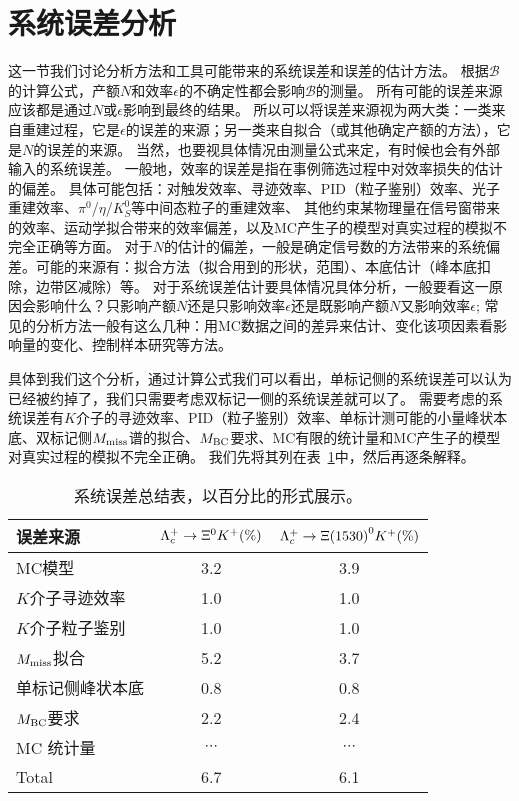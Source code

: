\section{系统误差分析}
这一节我们讨论分析方法和工具可能带来的系统误差和误差的估计方法。
根据$\mathcal{B}$的计算公式，产额$N$和效率$\epsilon$的不确定性都会影响$\mathcal{B}$的测量。
所有可能的误差来源应该都是通过$N$或$\epsilon$影响到最终的结果。
所以可以将误差来源视为两大类：一类来自重建过程，它是$\epsilon$的误差的来源；另一类来自拟合（或其他确定产额的方法），它是$N$的误差的来源。
当然，也要视具体情况由测量公式来定，有时候也会有外部输入的系统误差。
一般地，效率的误差是指在事例筛选过程中对效率损失的估计的偏差。
具体可能包括：对触发效率、寻迹效率、PID（粒子鉴别）效率、光子重建效率、$\pi^{0}$/$\eta$/$K_{S}^{0}$等中间态粒子的重建效率、
其他约束某物理量在信号窗带来的效率、运动学拟合带来的效率偏差，以及MC产生子的模型对真实过程的模拟不完全正确等方面。
对于$N$的估计的偏差，一般是确定信号数的方法带来的系统偏差。可能的来源有：拟合方法（拟合用到的形状，范围）、本底估计（峰本底扣除，边带区减除）等。
对于系统误差估计要具体情况具体分析，一般要看这一原因会影响什么？只影响产额$N$还是只影响效率$\epsilon$还是既影响产额$N$又影响效率$\epsilon$;
常见的分析方法一般有这么几种：用MC数据之间的差异来估计、变化该项因素看影响量的变化、控制样本研究等方法。


具体到我们这个分析，通过计算公式我们可以看出，单标记侧的系统误差可以认为已经被约掉了，我们只需要考虑双标记一侧的系统误差就可以了。
需要考虑的系统误差有$K$介子的寻迹效率、PID（粒子鉴别）效率、单标计测可能的小量峰状本底、双标记侧$M_{\rm miss}$谱的拟合、$M_{\rm BC}$要求、MC有限的统计量和MC产生子的模型对真实过程的模拟不完全正确。
我们先将其列在表~\ref{tab:sys_err}中，然后再逐条解释。

\begin{table}[hp]
  \begin{center}
    \caption{系统误差总结表，以百分比的形式展示。}
  \begin{tabular}{l|c|c}
      \hline \hline
			误差来源            &  $\Lambda_{c}^{+}\rightarrow \Xi^{0}K^{+}(\%)$ &  $\Lambda_{c}^{+}\rightarrow \Xi{(1530)}^{0}K^{+}(\%)$ \\
			\hline  
			 MC模型          &    3.2     &     3.9     \\
			$K$介子寻迹效率  &    1.0      &    1.0      \\
			$K$介子粒子鉴别   &    1.0      &    1.0      \\
			$M_{\rm miss}$拟合&    5.2     &     3.7     \\
单标记侧峰状本底   &    0.8     &     0.8     \\
			$M_{\rm BC}$要求      &    2.2     &     2.4    \\
      MC 统计量     & $\cdots$   &   $\cdots$    \\
			\hline
      Total             &    6.7      &    6.1     \\
      \hline\hline
    \end{tabular}
    \label{tab:sys_err}
  \end{center}
  \end{table}

